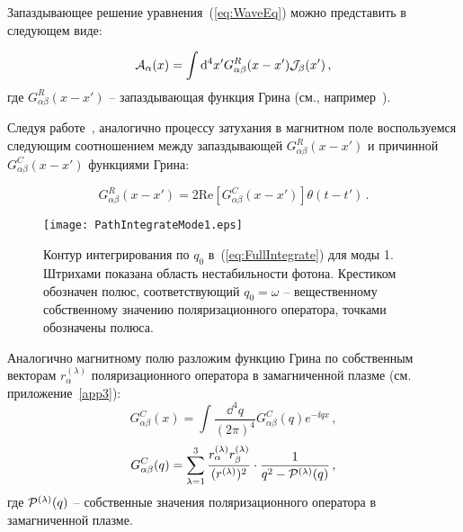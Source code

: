 
Запаздывающее решение уравнения~(\ref{eq:WaveEq}) можно представить в следующем виде:

\begin{equation}\label{eq:RetSol}
	{\cal A}_\alpha(x)=\int \mathrm{d}^4 x' G^R_{\alpha \beta}(x-x'){\cal J}_\beta(x')\, ,
\end{equation}
где $G^R_{\alpha \beta}(x-x')$ -- запаздывающая функция Грина (см., например~\cite{Landau:2001}).

Следуя работе~\cite{MikhChist:2001}, аналогично процессу затухания в магнитном поле воспользуемся следующим соотношением между запаздывающей $G^R_{\alpha\beta}(x-x')$ и причинной $G^C_{\alpha\beta}(x-x')$ функциями Грина:

\begin{equation}\label{eq:RetCasualGreen}
G^R_{\alpha\beta}(x-x')= 2 \mathrm{Re} \left[G^C_{\alpha\beta}(x-x')\right]\theta(t-t')\, .
\end{equation}

\begin{center}
	\begin{figure}[t!]\centering
		\texttt{[image: PathIntegrateMode1.eps]}
		\caption{Контур интегрирования по $q_0$ в~(\ref{eq:FullIntegrate}) для моды 1. Штрихами показана область нестабильности фотона. Крестиком обозначен полюс, соответствующий $q_0=\omega$ -- вещественному собственному значению поляризационного оператора, точками обозначены полюса.} \label{fig:FullPathIntegrMode1}
	\end{figure}
\end{center}

Аналогично магнитному полю разложим функцию Грина по собственным векторам $r_\alpha^{(\lambda)}$ поляризационного оператора в замагниченной плазме (см. приложение~\ref{app3}):
\begin{equation}\label{eq:InvGcFourier}
	G^C_{\alpha\beta}(x)=\int \frac{\dd^4q}{(2\pi)^4}G^C_{\alpha \beta}(q) e^{-\ii qx}\, ,
\end{equation}
\begin{equation}\label{eq:GcFourier}
	G^C_{\alpha\beta}(q)=\sum_{\lambda=1}^{3}\frac{r_\alpha^{(\lambda)}r^{(\lambda)}_\beta}{(r^{(\lambda)})^2}\cdot \frac{1}{q^2-{\cal P}^{(\lambda)}(q)}\, ,
\end{equation}
где ${\cal P}^{(\lambda)}(q)$ -- собственные значения поляризационного оператора в замагниченной плазме.

